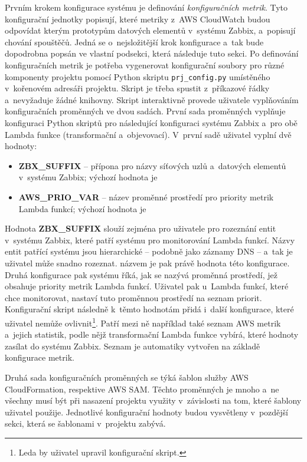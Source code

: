 \documentclass[czech, ing, kiv, he, iso690]{fasthesis}
\begin{document}
Prvním krokem konfigurace systému je definování \emph{konfiguračních metrik}. Tyto konfigurační jednotky popisují, které metriky z~AWS CloudWatch budou odpovídat kterým prototypům datových elementů v~systému Zabbix, a~popisují chování spouštěčů. Jedná se o~nejsložitější krok konfigurace a~tak bude dopodrobna popsán ve vlastní podsekci, která následuje tuto sekci. Po definování konfiguračních metrik je potřeba vygenerovat konfigurační soubory pro různé komponenty projektu pomocí Python skriptu \verb|prj_config.py| umístěného v~kořenovém adresáři projektu. Skript je třeba spustit z~příkazové řádky a~nevyžaduje žádné knihovny. Skript interaktivně provede uživatele vyplňováním konfiguračních proměnných ve dvou sadách. První sada proměnných vyplňuje konfiguraci Python skriptů pro následující konfiguraci systému Zabbix a~pro obě Lambda funkce (transformační a~objevovací). V~první sadě uživatel vyplní dvě hodnoty:

\begin{itemize}
    \item \textbf{ZBX\_SUFFIX} -- přípona pro názvy síťových uzlů a~datových elementů v~systému Zabbix; výchozí hodnota je 
    \item \textbf{AWS\_PRIO\_VAR} -- název proměnné prostředí pro priority metrik Lambda funkcí; výchozí hodnota je 
\end{itemize}

Hodnota \textbf{ZBX\_SUFFIX} slouží zejména pro uživatele pro rozeznání entit v~systému Zabbix, které patří systému pro monitorování Lambda funkcí. Názvy entit patřící systému jsou hierarchické -- podobně jako záznamy DNS -- a~tak je uživatel může snadno rozeznat.  názvem je pak právě hodnota této konfigurace. Druhá konfigurace pak systému říká, jak se nazývá proměnná prostředí, jež obsahuje priority metrik Lambda funkcí. Uživatel pak u~Lambda funkcí, které chce monitorovat, nastaví tuto proměnnou prostředí na seznam priorit. Konfigurační skript následně k~těmto hodnotám přidá i~další konfigurace, které uživatel nemůže ovlivnit\footnote{Leda by uživatel upravil konfigurační skript.}. Patří mezi ně například také seznam AWS metrik a~jejich statistik, podle nějž transformační Lambda funkce vybírá, které hodnoty zasílat do systému Zabbix. Seznam je automatiky vytvořen na základě konfigurace metrik.

Druhá sada konfiguračních proměnných se týká šablon služby AWS CloudFormation, respektive AWS SAM. Těchto proměnných je mnoho a~ne všechny musí být při nasazení projektu využity v~závislosti na tom, které šablony uživatel použije. Jednotlivé konfigurační hodnoty budou vysvětleny v~pozdější sekci, která se šablonami v~projektu zabývá.
\end{document}
